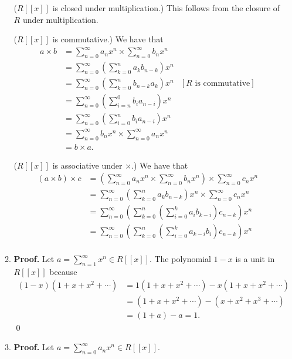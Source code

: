 \begin{enumerate}
\begin{enumerate}
               ($R[[x]]$ is closed under multiplication.) This follows from the
               closure of $R$ under multiplication.

               ($R[[x]]$ is commutative.) We have that
               \begin{align*}
                  a \times b &= \sum_{n=0}^\infty a_nx^n \times
                     \sum_{n=0}^\infty b_nx^n \\
                    &= \sum_{n=0}^\infty\left(
                       \sum_{k=0}^na_kb_{n-k}\right)x^n \\
                    &= \sum_{n=0}^\infty\left(\sum_{k=0}^nb_{n-k}a_k\right)x^n
                       &[R \text{ is commutative}] \\
                    &= \sum_{n=0}^\infty\left(\sum_{i=n}^0b_ia_{n-i}\right)x^n\\
                    &= \sum_{n=0}^\infty\left(\sum_{i=0}^nb_ia_{n-i}\right)x^n\\
                    &= \sum_{n=0}^\infty b_nx^n\times\sum_{n=0}^\infty a_nx^n\\
                    &= b \times a.
               \end{align*}

               ($R[[x]]$ is associative under $\times$.) We have that
               \begin{align*}
                  (a \times b) \times c &= \left(\sum_{n=0}^\infty a_nx^n \times
                     \sum_{n=0}^\infty b_nx^n\right) \times
                     \sum_{n=0}^\infty c_nx^n \\
                    &= \sum_{n=0}^\infty\left(
                       \sum_{k=0}^na_kb_{n-k}\right)x^n \times
                       \sum_{n=0}^\infty c_nx^n \\
                    &= \sum_{n=0}^\infty\left(\sum_{k=0}^n\left(\sum_{i=0}^k
                        a_ib_{k-i}\right)c_{n-k}\right)x^n \\
                    &= \sum_{n=0}^\infty\left(\sum_{k=0}^n\left(\sum_{i=0}^k
                        a_{k-i}b_i\right)c_{n-k}\right)x^n \\
               \end{align*}
         \item \textbf{Proof.} Let $a = \sum_{n = 1}^\infty x^n \in R[[x]]$. The
               polynomial $1 - x$ is a unit in $R[[x]]$ because
               \begin{align*}
                  (1 - x)(1 + x + x^2 + \cdots) &= 1(1 + x + x^2 + \cdots) -
                     x(1 + x + x^2 + \cdots) \\
                     &= (1 + x + x^2 + \cdots) - (x + x^2 + x^3 + \cdots) \\
                     &= (1 + a) - a = 1.
               \end{align*} \qed
         \item \textbf{Proof.} Let $a = \sum_{n = 0}^\infty a_nx^n \in R[[x]]$.


\end{enumerate}
\end{enumerate}
